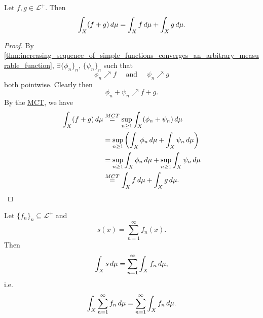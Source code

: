 \documentclass[notoc,notitlepage]{tufte-book}
\begin{document}
\begin{crly}\label{crly:addition_of_integrals_of_measurable_functions}
  Let $f, g \in \mathcal{L}^+$. Then
  \begin{equation*}
    \int_{X} (f + g) \mathop{}\!d{\mu} = \int_{X} f \mathop{}\!d{\mu} + \int_{X} g \mathop{}\!d{\mu}.
  \end{equation*}
\end{crly}

\begin{proof}
  By
  \cref{thm:increasing_sequence_of_simple_functions_converges_an_arbitrary_measurable_function},
  $\exists \{ \phi_n \}_{n},\, \{ \psi_n \}_{n}$ such that
  \begin{equation*}
    \phi_n \nearrow f \quad\text{ and }\quad \psi_n \nearrow g
  \end{equation*}
  both pointwise.
  Clearly then
  \begin{equation*}
    \phi_n + \psi_n \nearrow f + g.
  \end{equation*}
  By the \hyperref[thm:monotone_convergence_theorem]{MCT}, we have
  \begin{align*}
    \int_{X} (f + g) \dif{\mu}
    &\overset{MCT}{=} \sup_{n \geq 1} \int_{X} (\phi_n + \psi_n) \dif{\mu} \\
    &= \sup_{n \geq 1} \left( \int_{X} \phi_n \dif{\mu}
      + \int_{X} \psi_n \dif{\mu} \right) \\
    &= \sup_{n \geq 1} \int_{X} \phi_n \dif{\mu}
      + \sup_{n \geq 1} \int_{X} \psi_n \dif{\mu} \\
    &\overset{MCT}{=} \int_{X} f \dif{\mu} + \int_{X} g \dif{\mu}.
  \end{align*}
\end{proof}

\begin{crly}\label{crly:interchanging_infinite_sums_and_the_integral_sign}
  Let $\{ f_n \}_n \subseteq \mathcal{L}^+$ and
  \begin{equation*}
    s(x) = \sum_{n=1}^{\infty} f_n(x).
  \end{equation*}
  Then
  \begin{equation*}
    \int_{X} s \mathop{}\!d{\mu} = \sum_{n=1}^{\infty} \int_{X} f_n \mathop{}\!d{\mu},
  \end{equation*}
  i.e.
  \begin{equation*}
    \int_{X} \sum_{n=1}^{\infty} f_n \mathop{}\!d{\mu}
    = \sum_{n=1}^{\infty} \int_{X} f_n \mathop{}\!d{\mu}.
  \end{equation*}
\end{crly}
\end{document}
